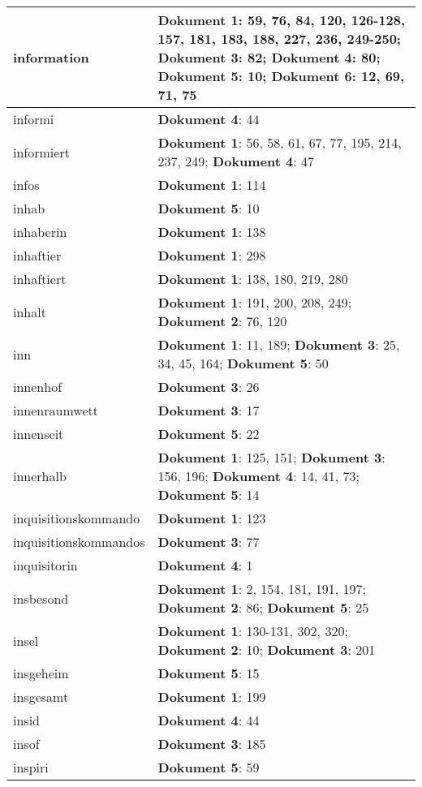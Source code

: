 \documentclass[a5paper]{article}
\begin{document}
\begin{longtable}[l]{|l|p{3in}|}
\hline
information & \textbf{Dokument 1}: 59, 76, 84, 120, 126-128, 157, 181, 183, 188, 227, 236, 249-250; \textbf{Dokument 3}: 82; \textbf{Dokument 4}: 80; \textbf{Dokument 5}: 10; \textbf{Dokument 6}: 12, 69, 71, 75 \\
\hline
informi & \textbf{Dokument 4}: 44 \\
\hline
informiert & \textbf{Dokument 1}: 56, 58, 61, 67, 77, 195, 214, 237, 249; \textbf{Dokument 4}: 47 \\
\hline
infos & \textbf{Dokument 1}: 114 \\
\hline
inhab & \textbf{Dokument 5}: 10 \\
\hline
inhaberin & \textbf{Dokument 1}: 138 \\
\hline
inhaftier & \textbf{Dokument 1}: 298 \\
\hline
inhaftiert & \textbf{Dokument 1}: 138, 180, 219, 280 \\
\hline
inhalt & \textbf{Dokument 1}: 191, 200, 208, 249; \textbf{Dokument 2}: 76, 120 \\
\hline
inn & \textbf{Dokument 1}: 11, 189; \textbf{Dokument 3}: 25, 34, 45, 164; \textbf{Dokument 5}: 50 \\
\hline
innenhof & \textbf{Dokument 3}: 26 \\
\hline
innenraumwett & \textbf{Dokument 3}: 17 \\
\hline
innenseit & \textbf{Dokument 5}: 22 \\
\hline
innerhalb & \textbf{Dokument 1}: 125, 151; \textbf{Dokument 3}: 156, 196; \textbf{Dokument 4}: 14, 41, 73; \textbf{Dokument 5}: 14 \\
\hline
inquisitionskommando & \textbf{Dokument 1}: 123 \\
\hline
inquisitionskommandos & \textbf{Dokument 3}: 77 \\
\hline
inquisitorin & \textbf{Dokument 4}: 1 \\
\hline
insbesond & \textbf{Dokument 1}: 2, 154, 181, 191, 197; \textbf{Dokument 2}: 86; \textbf{Dokument 5}: 25 \\
\hline
insel & \textbf{Dokument 1}: 130-131, 302, 320; \textbf{Dokument 2}: 10; \textbf{Dokument 3}: 201 \\
\hline
insgeheim & \textbf{Dokument 5}: 15 \\
\hline
insgesamt & \textbf{Dokument 1}: 199 \\
\hline
insid & \textbf{Dokument 4}: 44 \\
\hline
insof & \textbf{Dokument 3}: 185 \\
\hline
inspiri & \textbf{Dokument 5}: 59 \\

\end{longtable}
\end{document}
